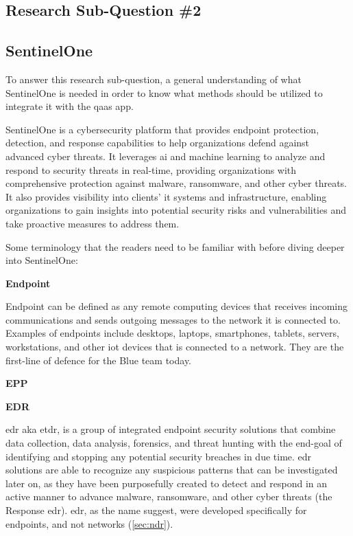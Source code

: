 \begin{multicols}{2}
      \section{Research Sub-Question \#2}
      \subsection{SentinelOne} %
      To answer this research sub-question, a general understanding of what SentinelOne is needed in order to know what
      methods should be utilized to integrate it with the \acrshort{qaas} app.

      SentinelOne is a cybersecurity platform that provides endpoint protection, detection, and response capabilities to
      help organizations defend against advanced cyber threats. It leverages \acrlong{ai} and machine learning to analyze
      and respond to security threats in real-time, providing organizations with comprehensive protection against malware,
      ransomware, and other cyber threats. It also provides visibility into clients' \acrshort{it} systems and infrastructure,
      enabling organizations to gain insights into potential security risks and vulnerabilities and take proactive measures
      to address them.

      Some terminology that the readers need to be familiar with before diving deeper into SentinelOne:

      \textbf{Endpoint}

      Endpoint can be defined as any remote computing devices that receives incoming communications and sends outgoing messages
      to the network it is connected to. Examples of endpoints include desktops, laptops, smartphones, tablets, servers, workstations,
      and other \acrshort{iot} devices that is connected to a network. They are the first-line of defence for the Blue team today.

      \textbf{EPP}

      \textbf{EDR}

      \acrshort{edr} \acrshort{aka} \acrshort{etdr}, is a group of integrated endpoint security solutions that combine data collection,
      data analysis, forensics, and threat hunting with the end-goal of identifying and stopping any potential security breaches in due time.
      \acrshort{edr} solutions are able to recognize any suspicious patterns that can be investigated later on, as they have been purposefully
      created to detect and respond in an active manner to advance malware, ransomware, and other cyber threats (the Response \acrshort{edr}).
      \acrshort{edr}, as the name suggest, were developed specifically for endpoints, and not networks (\ref{sec:ndr}).


\end{multicols}
